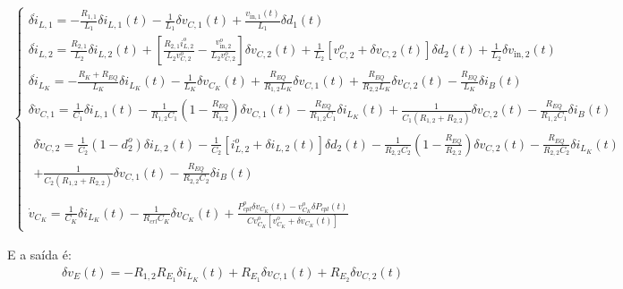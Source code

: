 \documentclass{article}
\newcommand{\ds}{\displaystyle}
\begin{document}
\begin{gather}
  \begin{cases}
  \delta \dot{i}_{L,1} = \ds - \frac{R_{1,1}}{L_1} \delta i_{L,1}(t) - \frac{1}{L_1} \delta v_{C,1}(t) + \frac{v_{\text{in}, 1}(t)}{L_1} \delta d_1(t) \\[12pt]
  \delta \dot{i}_{L,2} = \ds \frac{R_{2,1}}{L_2} \delta i_{L,2}(t)
  + \left[\frac{R_{2,1} i_{L,2}^o}{L_2 v_{C,2}^o} - \frac{v_{\text{in},2}^o}{L_2 v_{C,2}^o}\right] \delta v_{C,2}(t) + \frac{1}{L_2} \left[v_{C,2}^o + \delta v_{C,2}(t)\right] \delta d_2(t) + \frac{1}{L_2} \delta v_{\text{in},2}(t) \\[12pt]
  \delta \dot{i}_{L_K} = \ds - \frac{R_K + R_{EQ}}{L_K} \delta i_{L_K}(t)
  - \frac{1}{L_K} \delta v_{C_K}(t)
  + \frac{R_{EQ}}{{R_{1,2}}L_K} \delta v_{C,1}(t)
  + \frac{R_{EQ}}{R_{2,2}L_K} \delta v_{C,2}(t)
  - \frac{R_{EQ}}{L_K} \delta i_B(t) \\[12pt]
  \delta \dot v_{C,1} = \ds \frac{1}{C_1} \delta i_{L,1}(t)
  - \frac{1}{R_{1,2}C_1} \left(1 - \frac{R_{EQ}}{{R_{1,2}}}\right) \delta v_{C,1}(t)
  - \frac{R_{EQ}}{R_{1,2} C_1} \delta i_{L_K}(t)
  + \frac{1}{C_1 (R_{1,2} + R_{2,2})} \delta v_{C,2}(t)
  - \frac{R_{EQ}}{R_{1,2} C_1} \delta i_B(t) \\[12pt]
  \begin{aligned}
    \delta \dot v_{C,2} = \ds \frac{1}{C_2} (1 - d_2^o) \delta i_{L,2}(t) - \frac{1}{C_2} \left[i_{L,2}^o + \delta i_{L,2}(t)\right] \delta d_2(t)
    - \frac{1}{R_{2,2}C_2} \left(1 - \frac{R_{EQ}}{R_{2,2}}\right) \delta v_{C,2}(t)  
    - \frac{R_{EQ}}{R_{2,2} C_2} \delta i_{L_K}(t) \\+ \frac{1}{C_2(R_{1,2} + R_{2,2})}  \delta v_{C,1}(t) - \frac{R_{EQ}}{R_{2,2} C_2} \delta i_B(t) \\[12pt]
  \end{aligned} \\
  \dot{v}_{C_K} = \ds \frac{1}{C_K} \delta i_{L_K}(t)
  - \frac{1}{R_{crl} C_K} \delta v_{C_K}(t)
  + \frac{P_{cpl}^o \delta v_{C_K}(t) - v_{C_K}^o \delta P_{cpl}(t)}{Cv_{C_K}^o\left[v_{C_K}^o + \delta v_{C_K}(t)\right]}  
\end{cases}
\end{gather}

E a saída é:
\begin{gather}
  \delta v_E(t) = - R_{1,2} R_{E_1} \delta i_{L_K}(t) + R_{E_1} \delta v_{C,1}(t) + R_{E_2} \delta v_{C,2}(t)
\end{gather}
\end{document}
